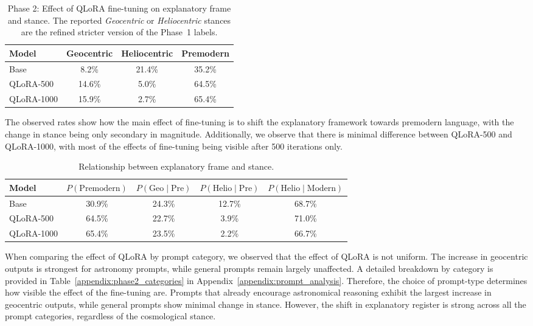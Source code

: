 \begin{table}[t]
\centering
\caption{Phase 2: Effect of QLoRA fine-tuning on explanatory frame and stance. The reported \textit{Geocentric} or \textit{Heliocentric} stances are the refined stricter version of the Phase~1 labels.}
\label{tab:phase2_summary}

\begin{tabular}{lccc}
\hline
Model & Geocentric & Heliocentric & Premodern \\
\hline
Base & 8.2\% & 21.4\% & 35.2\% \\
QLoRA-500 & 14.6\% & 5.0\% & 64.5\% \\
QLoRA-1000 & 15.9\% & 2.7\% & 65.4\% \\
\hline
\end{tabular}
\end{table}

The observed rates show how the main effect of fine-tuning is to shift the explanatory framework towards premodern language, with the change in stance being only secondary in magnitude. Additionally, we observe that there is minimal difference between QLoRA-500 and QLoRA-1000, with most of the effects of fine-tuning being visible after 500 iterations only.

\begin{table}[h]
\centering
\caption{Relationship between explanatory frame and stance.}
\label{tab:frame_stance_conditionals}
\begin{tabular}{lcccc}
\hline
Model & $P(\mathrm{Premodern})$ & $P(\mathrm{Geo}\mid\mathrm{Pre})$ & $P(\mathrm{Helio}\mid\mathrm{Pre})$ & $P(\mathrm{Helio}\mid\mathrm{Modern})$ \\
\hline
Base & 30.9\% & 24.3\% & 12.7\% & 68.7\% \\
QLoRA-500 & 64.5\% & 22.7\% & 3.9\% & 71.0\% \\
QLoRA-1000 & 65.4\% & 23.5\% & 2.2\% & 66.7\% \\
\hline
\end{tabular}
\end{table}

When comparing the effect of QLoRA by prompt category, we observed that the effect of QLoRA is not uniform. The increase in geocentric outputs is strongest for astronomy prompts, while general prompts remain largely unaffected. A detailed breakdown by category is provided in Table~\ref{appendix:phase2_categories} in Appendix~\ref{appendix:prompt_analysis}. Therefore, the choice of prompt-type determines how visible the effect of the fine-tuning are. Prompts that already encourage astronomical reasoning exhibit the largest increase in geocentric outputs, while general prompts show minimal change in stance. However, the shift in explanatory register is strong across all the prompt categories, regardless of the cosmological stance.

